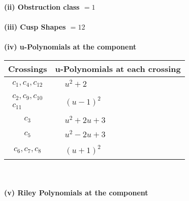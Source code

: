 \documentclass[1p]{elsarticle_modified}
\theoremstyle{definition}
\begin{document}
\flushleft \textbf{(ii) Obstruction class $= 1$}\\~\\
\flushleft \textbf{(iii) Cusp Shapes $= 12$}\\~\\
\newpage\renewcommand{\arraystretch}{1}
\flushleft \textbf{(iv) u-Polynomials at the component}\newline \\
\begin{tabular}{m{50pt}|m{274pt}}
Crossings & \hspace{64pt}u-Polynomials at each crossing \\
\hline $$\begin{aligned}c_{1},c_{4},c_{12}\end{aligned}$$&$\begin{aligned}
&u^2+2
\end{aligned}$\\
\hline $$\begin{aligned}c_{2},c_{9},c_{10}\\c_{11}\end{aligned}$$&$\begin{aligned}
&(u-1)^2
\end{aligned}$\\
\hline $$\begin{aligned}c_{3}\end{aligned}$$&$\begin{aligned}
&u^2+2 u+3
\end{aligned}$\\
\hline $$\begin{aligned}c_{5}\end{aligned}$$&$\begin{aligned}
&u^2-2 u+3
\end{aligned}$\\
\hline $$\begin{aligned}c_{6},c_{7},c_{8}\end{aligned}$$&$\begin{aligned}
&(u+1)^2
\end{aligned}$\\
\hline
\end{tabular}\\~\\
\newpage\renewcommand{\arraystretch}{1}
\flushleft \textbf{(v) Riley Polynomials at the component}\newline \\
\end{document}
